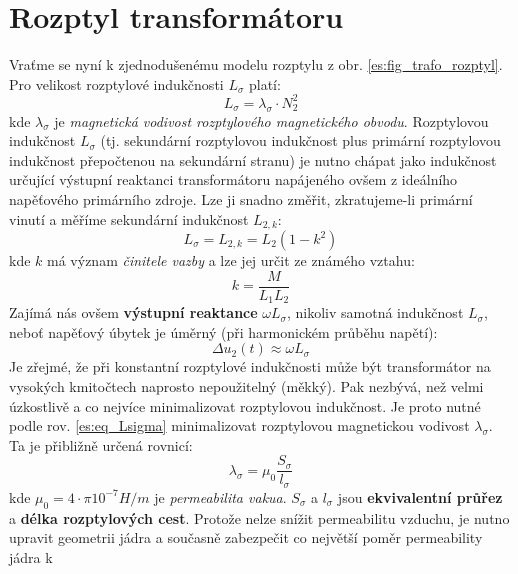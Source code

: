   \section{Rozptyl transformátoru}
    Vraťme se nyní k zjednodušenému modelu rozptylu z obr. \ref{es:fig_trafo_rozptyl}. Pro velikost
    roz\-ptyl\-ové indukčnosti $L_\sigma$ platí:
    \begin{equation}\label{es:eq_Lsigma}
      L_\sigma=\lambda_\sigma\cdot N_2^2
    \end{equation}
    kde $\lambda_\sigma$ je \emph{magnetická vodivost rozptylového magnetického obvodu}. Rozptylovou 
    indukčnost $L_\sigma$ (tj. sekundární rozptylovou indukčnost plus primární rozptylovou indukčnost 
    přepočtenou na sekundární stranu) je nutno chápat jako indukčnost určující výstupní reaktanci 
    transformátoru napájeného ovšem z ideálního napěťového primárního zdroje. Lze ji snadno změřit, 
    zkratujeme-li primární vinutí a měříme sekundární indukčnost
    $L_{2,k}$:
    \begin{equation}\label{es:eq_L2k}
      L_\sigma=L_{2,k}= L_2(1-k^2)
    \end{equation}
    kde $k$ má význam \emph{činitele vazby} a lze jej určit ze známého vztahu:
    \begin{equation}\label{es:eq_cinitel_vazby}
      k=\frac{M}{L_1L_2}
    \end{equation}
    Zajímá nás ovšem \textbf{výstupní reaktance} $\omega L_\sigma$, nikoliv samotná indukčnost $L_\sigma$, 
    neboť napěťový úbytek je úměrný (při harmonickém průběhu napětí):
    \begin{equation}\label{es:eq_nap_ubytek}
      \Delta u_2(t)\approx \omega L_\sigma
    \end{equation}
    Je zřejmé, že při konstantní rozptylové indukčnosti může být transformátor na vysokých kmitočtech 
    naprosto nepoužitelný (měkký). Pak nezbývá, než velmi ú\-zkost\-li\-vě a co nejvíce minimalizovat 
    rozptylovou indukčnost. Je proto nutné podle rov. \ref{es:eq_Lsigma} minimalizovat rozptylovou 
    magnetickou vodivost $\lambda_\sigma$. Ta je přibližně určená rovnicí:
    \begin{equation}\label{es:eq_rozptyl_vodivost}
      \lambda_\sigma= \mu_0\frac{S_\sigma}{l_\sigma}
    \end{equation}
    kde $\mu_0=4\cdot\pi10^{-7}H/m$ je \emph{permeabilita vakua}. $S_\sigma$ a $l_\sigma$ jsou
    \textbf{ekvivalentní průřez} a \textbf{délka rozptylových cest}. Protože nelze snížit  permeabilitu 
    vzduchu, je nutno upravit geometrii jádra a současně zabezpečit co největší poměr permeability jádra k 
